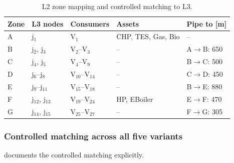 \documentclass[review,3p]{elsarticle}
\begin{document}
\begin{table}[htbp]
\centering
\caption{L2 zone mapping and controlled matching to L3.}
\label{tab:l2_zones}
\small
\begin{tabular}{@{} l l l l l @{}}
\toprule
Zone & L3 nodes & Consumers & Assets & Pipe to [m] \\
\midrule
A & j$_1$          & V$_1$              & CHP, TES, Gas, Bio & -- \\
B & j$_2$, j$_3$   & V$_2$--V$_3$       & --       & A$\to$B: 650 \\
C & j$_4$, j$_5$   & V$_4$--V$_9$       & --       & B$\to$C: 500 \\
D & j$_6$--j$_8$   & V$_{10}$--V$_{14}$ & --       & C$\to$D: 450 \\
E & j$_9$--j$_{11}$& V$_{15}$--V$_{18}$ & --       & B$\to$E: 880 \\
F & j$_{12}$, j$_{13}$ & V$_{19}$--V$_{24}$ & HP, EBoiler
  & E$\to$F: 470 \\
G & j$_{14}$, j$_{15}$ & V$_{25}$--V$_{27}$ & --
  & F$\to$G: 305 \\
\bottomrule
\end{tabular}
\end{table}

\subsubsection{Controlled matching across all five variants}
\label{sec:case_matching}

 documents the controlled matching explicitly.
\end{document}
